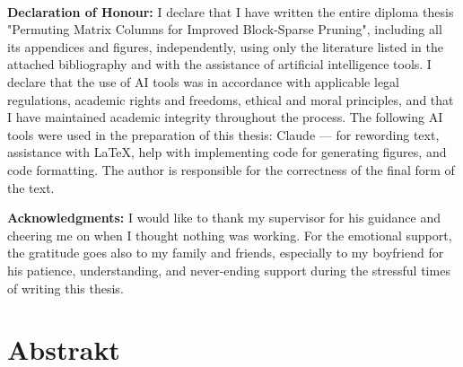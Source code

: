 \documentclass[12pt, twoside]{book}
\begin{document}




\newpage
\pagestyle{plain}
~

\vfill
{\bf Declaration of Honour:} I declare that I have written the entire diploma thesis "Permuting Matrix Columns for Improved Block-Sparse Pruning", including all its appendices and figures, independently, using only the literature listed in the attached bibliography and with the assistance of artificial intelligence tools. I declare that the use of AI tools was in accordance with applicable legal regulations, academic rights and freedoms, ethical and moral principles, and that I have maintained academic integrity throughout the process. The following AI tools were used in the preparation of this thesis: Claude — for rewording text, assistance with LaTeX, help with implementing code for generating figures, and code formatting. The author is responsible for the correctness of the final form of the text.

{\bf Acknowledgments:} I would like to thank my supervisor for his guidance and cheering me on when I thought nothing was working. For the emotional support, the gratitude goes also to my family and friends, especially to my boyfriend for his patience, understanding, and never-ending support during the stressful times of writing this thesis.

\newpage 
\section*{Abstrakt}
\end{document}
